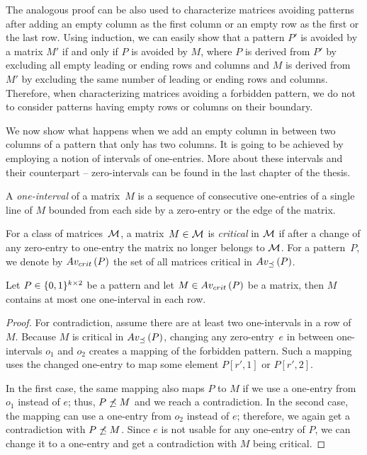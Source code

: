 The analogous proof can be also used to characterize matrices avoiding patterns after adding an empty column as the first column or an empty row as the first or the last row. Using induction, we can easily show that a pattern $P'$ is avoided by a matrix $M'$ if and only if $P$ is avoided by $M$, where $P$ is derived from $P'$ by excluding all empty leading or ending rows and columns and $M$ is derived from $M'$ by excluding the same number of leading or ending rows and columns. Therefore, when characterizing matrices avoiding a forbidden pattern, we do not to consider patterns having empty rows or columns on their boundary.

We now show what happens when we add an empty column in between two columns of a pattern that only has two columns. It is going to be achieved by employing a notion of intervals of one-entries. More about these intervals and their counterpart -- zero-intervals can be found in the last chapter of the thesis.

\begin{defn}
A \emph{one-interval} of a matrix~$M$ is a sequence of consecutive one-entries of a single line of $M$ bounded from each side by a zero-entry or the edge of the matrix.
\end{defn}

\begin{defn}
For a class of matrices~$\mathcal{M}$, a matrix~$M\in\mathcal{M}$ is \emph{critical} in $\mathcal{M}$ if after a change of any zero-entry to one-entry the matrix no longer belongs to $\mathcal{M}$. For a pattern~$P$, we denote by $Av_{crit}\left(P\right)$ the set of all matrices critical in $Av_{\preceq}\left(P\right)$. 
\end{defn}

\begin{lemma}
\label{lemma:twocols}
Let $P\in\{0,1\}^{k\times2}$ be a pattern and let $M\in Av_{crit}\left(P\right)$ be a matrix, then $M$ contains at most one one-interval in each row.
\end{lemma}
\begin{proof}
For contradiction, assume there are at least two one-intervals in a row of $M$. Because $M$ is critical in $Av_{\preceq}\left(P\right)$, changing any zero-entry~$e$ in between one-intervals $o_1$ and $o_2$ creates a mapping of the forbidden pattern. Such a mapping uses the changed one-entry to map some element $P[r',1]$ or $P[r',2]$.

In the first case, the same mapping also maps $P$ to $M$ if we use a one-entry from $o_1$ instead of $e$; thus, $P\not\preceq M$ and we reach a contradiction. In the second case, the mapping can use a one-entry from $o_2$ instead of $e$; therefore, we again get a contradiction with $P\not\preceq M$. Since $e$ is not usable for any one-entry of $P$, we can change it to a one-entry and get a contradiction with $M$ being critical.
\end{proof}


